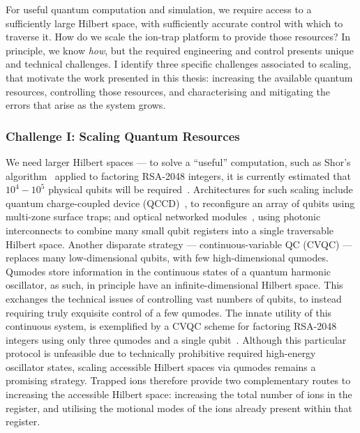 For useful quantum computation and simulation, we require access to a sufficiently large Hilbert space,
with sufficiently accurate control with which to traverse it. How do we scale the ion-trap
platform to provide those resources? In principle, we know \emph{how}, but the required engineering and control presents unique and technical challenges. I identify three
specific challenges associated to scaling, that motivate the work presented in this thesis:
increasing the available quantum resources, controlling those resources, and characterising and mitigating the errors that arise as the system grows.

\subsubsection{Challenge I: Scaling Quantum Resources}
We need larger Hilbert spaces --- to solve a ``useful'' computation, such as
Shor's algorithm~\cite{shor_polynomial-time_1997} applied to factoring RSA-2048
integers, it is currently estimated that
$10^4-10^5$ physical qubits will be required~\cite{cain_shors_2026,
webster_pinnacle_2026}. Architectures for such scaling include quantum charge-coupled device (QCCD)~\cite{kielpinski_architecture_2002},
to reconfigure an array of qubits using multi-zone surface traps; and optical
networked modules~\cite{luo_protocols_2009}, using photonic interconnects to combine many small
qubit registers into a single traversable Hilbert space. Another disparate strategy
--- continuous-variable QC (CVQC) --- replaces many low-dimensional
qubits, with few high-dimensional qumodes. Qumodes store information in the continuous states of a quantum harmonic oscillator, as such, in principle have an infinite-dimensional Hilbert space. This exchanges the
technical issues of controlling vast numbers of qubits, to instead requiring
truly exquisite control of a few qumodes. The innate utility of this continuous
system, is exemplified by a CVQC scheme for
factoring RSA-2048 integers using only three qumodes and a single
qubit~\cite{brenner_factoring_2025}. Although this particular protocol is
unfeasible due to technically prohibitive required high-energy
oscillator states, scaling accessible Hilbert spaces via qumodes remains a promising
strategy. Trapped ions therefore provide two complementary routes to increasing the accessible Hilbert space: increasing the total number of ions in the register, and utilising the motional modes of the ions already present within that register.


